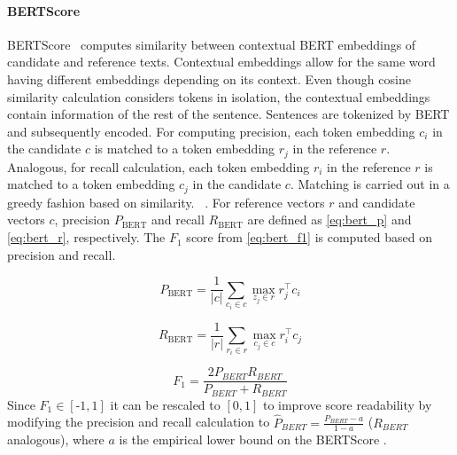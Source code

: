 \paragraph{BERTScore}
BERTScore~\citep{hanna_fine_grained_2021} computes similarity between contextual BERT embeddings of candidate and reference texts. 
Contextual embeddings allow for the same word having different embeddings depending on its context.
Even though cosine similarity calculation considers tokens in isolation, the contextual embeddings contain information of the rest of the sentence.
Sentences are tokenized by BERT and subsequently encoded.
For computing precision, each token embedding $c_i$ in the candidate $c$ is matched to a token embedding $r_j$ in the reference $r$.
Analogous, for recall calculation, each token embedding $r_i$ in the reference $r$ is matched to a token embedding $c_j$ in the candidate $c$.
Matching is carried out in a greedy fashion based on similarity.
~\citep{zhang_bertscore_2020}.
For reference vectors $r$ and candidate vectors $c$, precision $P_{\text{BERT}}$ and recall $R_{\text{BERT}}$ are defined as \autoref{eq:bert_p} and \autoref{eq:bert_r}, respectively.
The $F_1$ score from \autoref{eq:bert_f1} is computed based on precision and recall.

\begin{equation}
    P_{\text{BERT}} = \frac{1}{|c|} \sum_{c_i \in c} \max_{z_j \in r} r_j^\top c_i
\label{eq:bert_p}
\end{equation}

\begin{equation}
    R_{\text{BERT}} = \frac{1}{|r|} \sum_{r_i \in r} \max_{c_j \in c} r_i^\top c_j
\label{eq:bert_r}
\end{equation}

\begin{equation}
    F_1 = \frac{2 P_{BERT} R_{BERT}}{P_{BERT} + R_{BERT}} 
\label{eq:bert_f1}
\end{equation}
Since $F_1 \in \left[\text{-}1,1\right]$ it can be rescaled to $[0,1]$ to improve score readability by modifying the precision and recall calculation 
to $\hat{P}_{BERT} = \frac{P_{BERT} - a}{1 - a}$ ($R_{BERT}$ analogous), where $a$ is the empirical lower bound on the BERTScore \citep{zhang_bertscore_2020,hanna_fine_grained_2021}.


